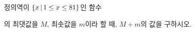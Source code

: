 정의역이 $\{x\mkern3mu |\mkern3mu 1\le x\le 81\}$인 함수 \par\smallskip{}\par\smallskip\noindent 의 최댓값을 $M$, 최솟값을 $m$이라 할 때, $M+m$의 값을 구하시오.

